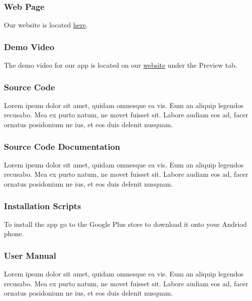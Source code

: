 \subsubsection{Web Page}
Our website is located \href{https://sd2.000webhostapp.com/}{here}.

\subsubsection{Demo Video}
The demo video for our app is located on our \href{https://sd2.000webhostapp.com/}{website} under the Preview tab.

\subsubsection{Source Code}
Lorem ipsum dolor sit amet, quidam omnesque ea vis. Eum an aliquip legendos recusabo. Mea ex purto natum, ne movet fuisset sit. Labore audiam eos ad, facer ornatus posidonium ne ius, et eos duis delenit nusquam.

\subsubsection{Source Code Documentation}
Lorem ipsum dolor sit amet, quidam omnesque ea vis. Eum an aliquip legendos recusabo. Mea ex purto natum, ne movet fuisset sit. Labore audiam eos ad, facer ornatus posidonium ne ius, et eos duis delenit nusquam.



\subsubsection{Installation Scripts}
To install the app go to the Google Plus store to download it onto your Andriod phone.

\subsubsection{User Manual}
Lorem ipsum dolor sit amet, quidam omnesque ea vis. Eum an aliquip legendos recusabo. Mea ex purto natum, ne movet fuisset sit. Labore audiam eos ad, facer ornatus posidonium ne ius, et eos duis delenit nusquam.
